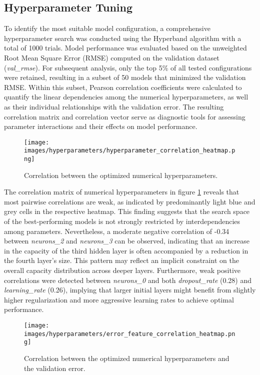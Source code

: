 \subsection{Hyperparameter Tuning}
To identify the most suitable model configuration, a comprehensive hyperparameter search was conducted using the Hyperband algorithm with a total of 1000 trials. Model performance was evaluated based on the unweighted Root Mean Square Error (RMSE) computed on the validation dataset (\textit{val\_rmse}). For subsequent analysis, only the top 5\% of all tested configurations were retained, resulting in a subset of 50 models that minimized the validation RMSE. Within this subset, Pearson correlation coefficients were calculated to quantify the linear dependencies among the numerical hyperparameters, as well as their individual relationships with the validation error. The resulting correlation matrix and correlation vector serve as diagnostic tools for assessing parameter interactions and their effects on model performance.

\begin{figure}[H]
	\centering
	\texttt{[image: images/hyperparameters/hyperparameter\_correlation\_heatmap.png]}
	\caption{Correlation between the optimized numerical hyperparameters.}
	\label{fig:hyperparameter_correlation}
\end{figure}

The correlation matrix of numerical hyperparameters in figure \ref{fig:hyperparameter_correlation} reveals that most pairwise correlations are weak, as indicated by predominantly light blue and grey cells in the respective heatmap. This finding suggests that the search space of the best-performing models is not strongly restricted by interdependencies among parameters. Nevertheless, a moderate negative correlation of -0.34 between \textit{neurons\_2} and \textit{neurons\_3} can be observed, indicating that an increase in the capacity of the third hidden layer is often accompanied by a reduction in the fourth layer’s size. This pattern may reflect an implicit constraint on the overall capacity distribution across deeper layers. Furthermore, weak positive correlations were detected between \textit{neurons\_0} and both \textit{dropout\_rate} (0.28) and \textit{learning\_rate} (0.26), implying that larger initial layers might benefit from slightly higher regularization and more aggressive learning rates to achieve optimal performance.

\begin{figure}[H]
	\centering
	\texttt{[image: images/hyperparameters/error\_feature\_correlation\_heatmap.png]}
	\caption{Correlation between the optimized numerical hyperparameters and the validation error.}
	\label{fig:error_feature_correlation_heatmap}
\end{figure}

